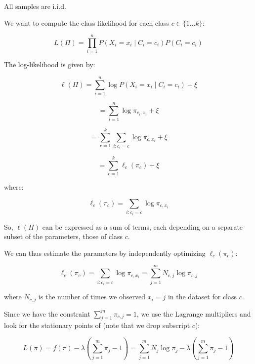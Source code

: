 All samples are i.i.d.

We want to compute the class likelihood for each class $c \in \{1 \ldots k\}$:

\begin{equation*}
L(\Pi)=\prod_{i=1}^n P(X_i = x_i \mid C_i = c_i)P(C_i = c_i)
\end{equation*}

The log-likelihood is given by:

\begin{equation*}
\ell(\Pi)=\sum_{i=1}^n \log P(X_i = x_i \mid C_i = c_i) + \xi
\end{equation*}

\begin{equation*}
= \sum_{i=1}^n \log \pi_{c_i, x_i} + \xi
\end{equation*}

\begin{equation*}
= \sum_{c=1}^k \sum_{i: c_i = c} \log \pi_{c, x_i} + \xi
\end{equation*}

\begin{equation*}
= \sum_{c=1}^k \ell_c(\pi_c) + \xi
\end{equation*}

where:

\begin{equation*}
\ell_c(\pi_c) = \sum_{i: c_i = c} \log \pi_{c, x_i}
\end{equation*}

So, $\ell(\Pi)$ can be expressed as a sum of terms, each depending on a separate subset of the parameters, those of class $c$.

We can thus estimate the parameters by independently optimizing $\ell_c(\pi_c)$:

\begin{equation*}
\ell_c(\pi_c) = \sum_{i: c_i = c} \log \pi_{c, x_i} = \sum_{j=1}^m N_{c,j} \log \pi_{c,j}
\end{equation*}

where $N_{c,j}$ is the number of times we observed $x_i = j$ in the dataset for class $c$.

Since we have the constraint $\sum_{j=1}^{m} \pi_{c,j} = 1$, we use the Lagrange multipliers and look for the stationary points of (note that we drop subscript $c$):

\begin{equation*}
L(\pi) = f(\pi) - \lambda \left(\sum_{j=1}^m \pi_j - 1\right) = \sum_{j=1}^m N_j \log \pi_j - \lambda \left(\sum_{j=1}^m \pi_j - 1\right)
\end{equation*}

